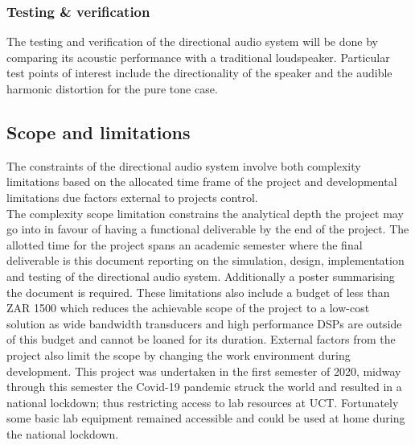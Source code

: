 \subsubsection{Testing \& verification}
The testing and verification of the directional audio system will be done by comparing its acoustic performance with a traditional loudspeaker. Particular test points of interest include the directionality of the speaker and the audible harmonic distortion for the pure tone case.

\subsection{Scope and limitations}
The constraints of the directional audio system involve both complexity limitations based on the allocated time frame of the project and developmental limitations due factors external to projects control.\\
The complexity scope limitation constrains the analytical depth the project may go into in favour of having a functional deliverable by the end of the project. The allotted time for the project spans an academic semester where the final deliverable is this document reporting on the simulation, design, implementation and testing of the directional audio system. Additionally a poster summarising the document is required.
These limitations also include a budget of less than ZAR 1500 which reduces the achievable scope of the project to a low-cost solution as wide bandwidth transducers and high performance DSPs are outside of this budget and cannot be loaned for its duration.
External factors from the project also limit the scope by changing the work environment during development. This project was undertaken in the first semester of 2020, midway through this semester the Covid-19 pandemic struck the world and resulted in a national lockdown; thus restricting access to lab resources at UCT. Fortunately some basic lab equipment remained accessible and could be used at home during the national lockdown.
